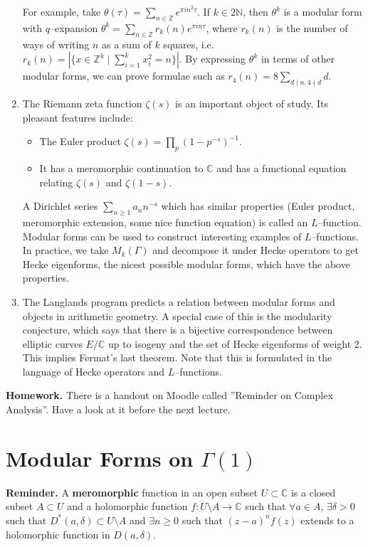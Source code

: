 \documentclass{article}
\theoremstyle{definition}
\begin{document}
\begin{enumerate}[(1)]
    For example, take $\theta(\tau) = \sum_{n \in \mathbb{Z}}^{} e^{\pi i n^2 \tau}$. If $k \in 2\mathbb{N}$, then $\theta^{k}$ is a modular form with $q$--expansion $\theta^{k} = \sum_{n \in \mathbb{Z}}^{} r_k(n) e^{\pi i n \tau}$, where $r_k(n)$ is the number of ways of writing $n$ as a sum of $k$ squares, i.e. $r_k(n) = |\{x \in \mathbb{Z}^k \mid \sum_{i=1}^{k} x_i^2 = n\}|$.
    By expressing $\theta^k$ in terms of other modular forms, we can prove formulae such as $r_4(n) = 8 \sum_{d \mid n, 4 \nmid d}^{} d$.
    \item The Riemann zeta function $\zeta(s)$ is an important object of study. Its pleasant features include:
    \begin{itemize}
        \item The Euler product $\zeta(s) = \prod_{p}^{} (1-p^{-s})^{-1}$.
        \item It has a meromorphic continuation to $\mathbb{C}$ and has a functional equation relating $\zeta(s)$ and $\zeta(1-s)$.
    \end{itemize}
    A Dirichlet series $\sum_{n\ge 1}^{} a_n n^{-s}$ which has similar properties (Euler product, meromorphic extension, some nice function equation) is called an $L$--function. Modular forms can be used to construct interesting examples of $L$--functions. In practice, we take $M_k(\Gamma)$ and decompose it under Hecke operators to get Hecke eigenforms, the nicest possible modular forms, which have the above properties.
    \item The Langlands program predicts a relation between modular forms and objects in arithmetic geometry. A special case of this is the modularity conjecture, which says that there is a bijective correspondence between elliptic curves $E/\mathbb{C}$ up to isogeny and the set of Hecke eigenforms of weight 2. This implies Fermat's last theorem. Note that this is formulated in the language of Hecke operators and $L$--functions.
\end{enumerate}
\textbf{Homework.} There is a handout on Moodle called ''Reminder on Complex Analysis''. Have a look at it before the next lecture.

\newpage

\section{Modular Forms on $\Gamma(1)$}


\textbf{Reminder.} A \textbf{meromorphic} function in an open subset $U \subset \mathbb{C}$ is a closed subset $A \subset U$ and a holomorphic function $f : U \setminus A \to \mathbb{C}$ such that $\forall a \in A$, $\exists \delta > 0$ such that $D^*(a,\delta) \subset U\setminus A$ and $\exists n \ge 0$ such that $(z-a)^n f(z)$ extends to a holomorphic function in $D(a,\delta)$.
\vspace{1mm}
 
\end{document}

